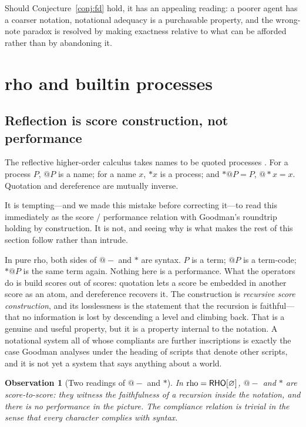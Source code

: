 \documentclass[11pt,a4paper]{article}
\makeatletter
\theoremstyle{definition}
\theoremstyle{plain}
\newtheorem{observation}[definition]{Observation}
\theoremstyle{remark}
\newcommand{\rc}{\textup{rho}}
\newcommand{\RHO}{\mathsf{RHO}}
\newcommand{\quo}[1]{@#1}
\makeatother
\begin{document}
Should Conjecture~\ref{conj:fd} hold, it has an appealing reading: a poorer agent has a
coarser notation, notational adequacy is a purchasable property, and the wrong-note
paradox is resolved by making exactness relative to what can be afforded rather than by
abandoning it.

\section{\rc{} and builtin processes}
\label{sec:rho}

\subsection{Reflection is score construction, not performance}
\label{sec:scoreconstruction}

The reflective higher-order calculus takes names to be quoted processes
\cite{meredith2005}. For a process $P$, $\quo{P}$ is a name; for a name $x$, $*x$ is a
process; and $*\quo{P} = P$, $\quo{*x} = x$. Quotation and dereference are mutually
inverse.

It is tempting---and we made this mistake before correcting it---to read this immediately
as the score / performance relation with Goodman's roundtrip holding by construction. It is
not, and seeing why is what makes the rest of this section follow rather than intrude.

In pure \rc{}, both sides of $\quo{-}$ and $*$ are syntax. $P$ is a term; $\quo{P}$ is a
term-code; $*\quo{P}$ is the same term again. Nothing here is a performance. What the
operators do is build scores out of scores: quotation lets a score be embedded in another
score as an atom, and dereference recovers it. The construction is \emph{recursive score
construction}, and its losslessness is the statement that the recursion is faithful---that
no information is lost by descending a level and climbing back. That is a genuine and
useful property, but it is a property internal to the notation. A notational system all of
whose compliants are further inscriptions is exactly the case Goodman analyses under the
heading of scripts that denote other scripts, and it is not yet a system that says anything
about a world.

\begin{observation}[Two readings of $\quo{-}$ and $*$]
\label{obs:tworeadings}
In $\rc = \RHO[\varnothing]$, $\quo{-}$ and $*$ are score-to-score: they witness the
faithfulness of a recursion inside the notation, and there is no performance in the picture.
The compliance relation is trivial in the sense that every character complies with syntax.
\end{observation}
\end{document}
